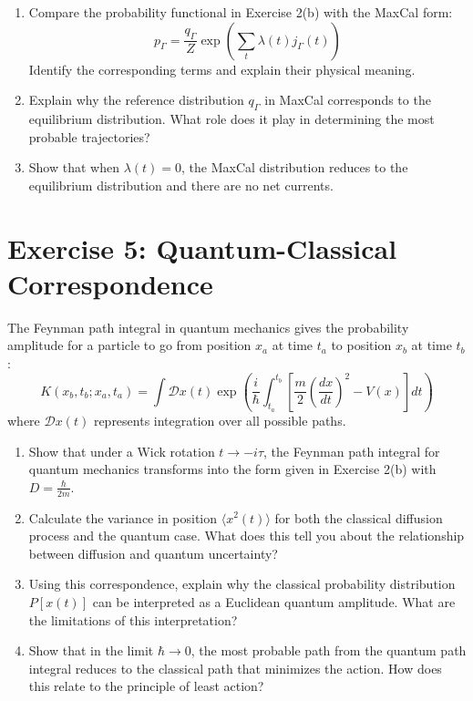 \documentclass{article}
\begin{document}
\begin{enumerate}
    \item[(a)] Compare the probability functional in Exercise 2(b) with the MaxCal form:
    \[ p_\Gamma = \frac{q_\Gamma}{Z}\exp\left(\sum_t \lambda(t)j_\Gamma(t)\right) \]
    Identify the corresponding terms and explain their physical meaning.
    
    \item[(b)] Explain why the reference distribution $q_\Gamma$ in MaxCal corresponds to the equilibrium distribution. What role does it play in determining the most probable trajectories?
    
    \item[(c)] Show that when $\lambda(t)=0$, the MaxCal distribution reduces to the equilibrium distribution and there are no net currents.
\end{enumerate}

\section*{Exercise 5: Quantum-Classical Correspondence}

The Feynman path integral in quantum mechanics gives the probability amplitude for a particle to go from position $x_a$ at time $t_a$ to position $x_b$ at time $t_b$:
\[
K(x_b,t_b;x_a,t_a) = \int \mathcal{D}x(t) \exp\left(\frac{i}{\hbar}\int_{t_a}^{t_b} \left[\frac{m}{2}\left(\frac{dx}{dt}\right)^2 - V(x)\right]dt\right)
\]
where $\mathcal{D}x(t)$ represents integration over all possible paths.

\begin{enumerate}
    \item[(a)] Show that under a Wick rotation $t \to -i\tau$, the Feynman path integral for quantum mechanics transforms into the form given in Exercise 2(b) with $D = \frac{\hbar}{2m}$.
    
    \item[(b)] Calculate the variance in position $\langle x^2(t) \rangle$ for both the classical diffusion process and the quantum case. What does this tell you about the relationship between diffusion and quantum uncertainty?
    
    \item[(c)] Using this correspondence, explain why the classical probability distribution $P[x(t)]$ can be interpreted as a Euclidean quantum amplitude. What are the limitations of this interpretation?
    
    \item[(d)] Show that in the limit $\hbar \to 0$, the most probable path from the quantum path integral reduces to the classical path that minimizes the action. How does this relate to the principle of least action?
\end{enumerate}
\end{document}
